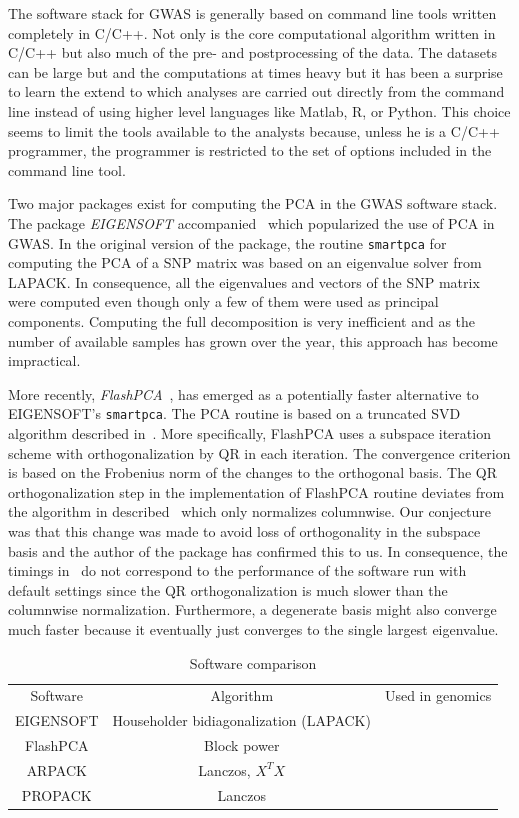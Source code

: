 \documentclass[review]{siamart0516}
\newcommand{\cmark}{\ding{51}}%
\newcommand{\xmark}{\ding{55}}%
\begin{document}
The software stack for GWAS is generally based on command line tools written completely in C/C++. Not only is the core computational algorithm written in C/C++ but also much of the pre- and postprocessing of the data. The datasets can be large but and the computations at times heavy but it has been a surprise to learn the extend to which analyses are carried out directly from the command line instead of using higher level languages like Matlab, R, or Python. This choice seems to limit the tools available to the analysts because, unless he is a C/C++ programmer, the programmer is restricted to the set of options included in the command line tool.

Two major packages exist for computing the PCA in the GWAS software stack. The package \emph{EIGENSOFT} accompanied~\cite{Patterson2006} which popularized the use of PCA in GWAS. In the original version of the package, the routine \texttt{smartpca} for computing the PCA of a SNP matrix was based on an eigenvalue solver from LAPACK. In consequence, all the eigenvalues and vectors of the SNP matrix were computed even though only a few of them were used as principal components. Computing the full decomposition is very inefficient and as the number of available samples has grown over the year, this approach has become impractical.

More recently, \emph{FlashPCA}~\cite{abraham2014fast}, has emerged as a potentially faster alternative to EIGENSOFT's \texttt{smartpca}. The PCA routine is based on a truncated SVD algorithm described in~\cite{halko2011finding}. More specifically, FlashPCA uses a subspace iteration scheme with orthogonalization by QR in each iteration. The convergence criterion is based on the Frobenius norm of the changes to the orthogonal basis. The QR orthogonalization step in the implementation of FlashPCA routine deviates from the algorithm in described~\cite{abraham2014fast} which only normalizes columnwise. Our conjecture was that this change was made to avoid loss of orthogonality in the subspace basis and the author of the package has confirmed this to us. In consequence, the timings in~\cite{abraham2014fast} do not correspond to the performance of the software run with default settings since the QR orthogonalization is much slower than the columnwise normalization. Furthermore, a degenerate basis might also converge much faster because it eventually just converges to the single largest eigenvalue.

\begin{table}
    \centering
    \caption{Software comparison}
    \begin{tabular}{ccc}
        Software  & Algorithm                              & Used in genomics \\
        EIGENSOFT & Householder bidiagonalization (LAPACK) & \cmark \\
        FlashPCA  & Block power                            & \cmark \\
        ARPACK    & Lanczos, $X^TX$                         & \xmark \\
        PROPACK   & Lanczos                                & \xmark
    \end{tabular}
\end{table}
\end{document}
